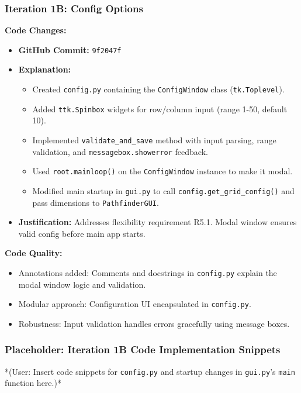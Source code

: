 \newpage

\subsubsection{Iteration 1B: Config Options}

\textbf{Code Changes:}
\begin{itemize}
	\item \textbf{GitHub Commit:} \verb|9f2047f|
	\item \textbf{Explanation:}
	\begin{itemize}
		\item Created \verb|config.py| containing the \verb|ConfigWindow| class (\verb|tk.Toplevel|).
		\item Added \verb|ttk.Spinbox| widgets for row/column input (range 1-50, default 10).
		\item Implemented \verb|validate_and_save| method with input parsing, range validation, and \verb|messagebox.showerror| feedback.
		\item Used \verb|root.mainloop()| on the \verb|ConfigWindow| instance to make it modal.
		\item Modified main startup in \verb|gui.py| to call \verb|config.get_grid_config()| and pass dimensions to \verb|PathfinderGUI|.
	\end{itemize}
	\item \textbf{Justification:} Addresses flexibility requirement R5.1. Modal window ensures valid config before main app starts.
\end{itemize}

\textbf{Code Quality:}
\begin{itemize}
	\item Annotations added: Comments and docstrings in \verb|config.py| explain the modal window logic and validation.
	\item Modular approach: Configuration UI encapsulated in \verb|config.py|.
	\item Robustness: Input validation handles errors gracefully using message boxes.
\end{itemize}

\newpage
\subsubsection*{Placeholder: Iteration 1B Code Implementation Snippets}
*(User: Insert code snippets for \verb|config.py| and startup changes in \verb|gui.py|'s \verb|main| function here.)*
\newpage

